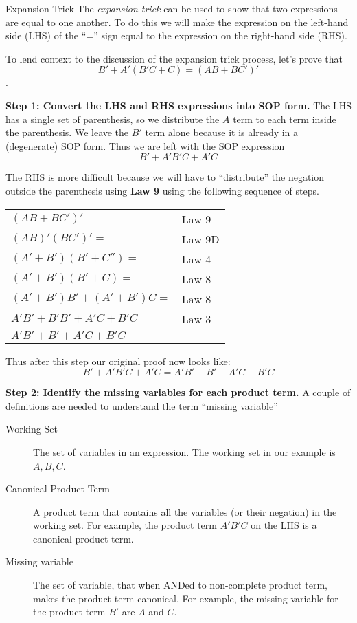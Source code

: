 \begin{process}{Expansion Trick}
\label{process:representationsExpansionTrick}
The \textit{expansion trick} can be used to show that two expressions are 
equal to one another.  To do this we will make the expression on the 
left-hand side (LHS) of the ``='' sign equal to the expression on the
right-hand side (RHS).  

To lend context to the discussion of the expansion trick process, let's prove 
that $$B' + A'(B'C + C) = (AB + BC')'$$.

\textbf{Step 1: Convert the LHS and RHS expressions into SOP form.}
The LHS has a single set of parenthesis, so we distribute the $A$ term to each
term inside the parenthesis.  We leave the $B'$ term alone because it is already
in a (degenerate) SOP form.  Thus we are left with the SOP expression 
$$B' + A'B'C + A'C$$

The RHS is more difficult because we will have to ``distribute'' the negation outside the 
parenthesis using \textbf{Law 9} using the following sequence of steps.

\begin{tabular}[ht]{ll}
 $(AB + BC')'$ 					& Law 9	\\ 
 $(AB)' (BC')'=$					& Law 9D 	\\ 
 $(A' + B') (B' + C'') =$			& Law 4 	\\ 
 $(A' + B') (B' + C) =$				& Law 8 	\\ 
 $(A' + B') B' + (A' + B') C =$		& Law 8 	\\ 
$A'B' + B'B' + A'C + B'C =$		& Law 3 	\\ 
$A'B' + B' + A'C + B'C $				&  	\\ 
\end{tabular}

Thus after this step our original proof now looks like:
$$B' + A'B'C + A'C = A'B' + B' + A'C  + B'C $$

\textbf{Step 2: Identify the missing variables for each product term.}
A couple of definitions are needed to understand the term ``missing variable''

\begin{description}
   \item[Working Set] The set of variables in an expression. The working set in our example is ${A, B, C}$.
   \item[Canonical Product Term] A product term that contains all the variables (or their negation) in the working set.
   For example, the product term $A'B'C$ on the LHS is a canonical product term.
   \item[Missing variable] The set of variable, that when ANDed to non-complete product term, makes the product term canonical.
   For example, the missing variable for the product term $B'$ are $A$ and $C$.
\end{description}


\end{process}
